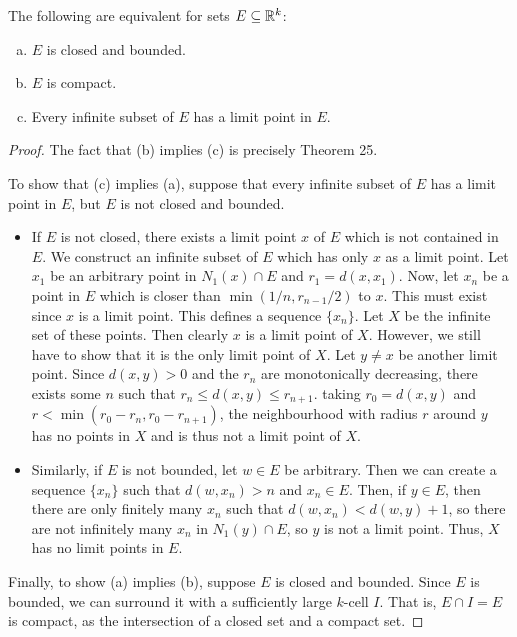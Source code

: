 \begin{theorem}
The following are equivalent for sets $E \subseteq \mathbb{R}^k$:
\begin{enumerate}[(a)]
\item $E$ is closed and bounded.
\item $E$ is compact.
\item Every infinite subset of $E$ has a limit point in $E$.
\end{enumerate}

\begin{proof}
The fact that (b) implies (c) is precisely Theorem 25. 

To show that (c) implies (a), suppose that every infinite subset of $E$ has a limit point in $E$, but $E$ is not closed and bounded. 

\begin{itemize}
\item 
If $E$ is not closed, there exists a limit point $x$ of $E$ which is not contained in $E$. We construct an infinite subset of $E$ which has only $x$ as a limit point. Let $x_1$ be an arbitrary point in $N_1(x) \cap E$ and $r_1 = d(x, x_1)$. Now, let $x_n$ be a point in $E$ which is closer than $\min(1/n, r_{n-1}/2)$ to $x$. This must exist since $x$ is a limit point. This defines a sequence $\{x_n\}$. Let $X$ be the infinite set of these points. Then clearly $x$ is a limit point of $X$. However, we still have to show that it is the only limit point of $X$. Let $y \ne x$ be another limit point. Since $d(x, y) > 0$ and the $r_n$ are monotonically decreasing, there exists some $n$ such that $r_n \le d(x, y) \le r_{n+1}$. taking $r_0 = d(x, y)$ and $r < \min(r_0 - r_n, r_0 - r_{n+1})$, the neighbourhood with radius $r$ around $y$ has no points in $X$ and is thus not a limit point of $X$. 

\item
Similarly, if $E$ is not bounded, let $w \in E$ be arbitrary. Then we can create a sequence $\{x_n\}$ such that $d(w, x_n) > n$ and $x_n \in E$. Then, if $y \in E$, then there are only finitely many $x_n$ such that $d(w, x_n) < d(w, y) + 1$, so there are not infinitely many $x_n$ in $N_1(y) \cap E$, so $y$ is not a limit point. Thus, $X$ has no limit points in $E$.

\end{itemize}

Finally, to show (a) implies (b), suppose $E$ is closed and bounded. Since $E$ is bounded, we can surround it with a sufficiently large $k$-cell $I$. That is, $E \cap I = E$ is compact, as the intersection of a closed set and a compact set.
\end{proof}
\end{theorem}

